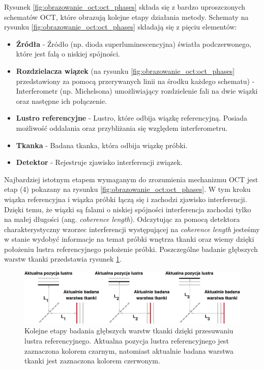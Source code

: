 Rysunek \ref{fig:obrazowanie_oct:oct_phases} składa się z bardzo uproszczonych schematów OCT, które obrazują kolejne etapy działania metody. Schematy na rysunku \ref{fig:obrazowanie_oct:oct_phases} składają się z pięciu elementów:

\begin{itemize}

\item \textbf{Źródła} - Źródło (np. dioda superluminescencyjna) światła podczerwonego, które jest falą o niskiej spójności.
\item \textbf{Rozdzielacza wiązek} (na rysunku \ref{fig:obrazowanie_oct:oct_phases} przedstawiony za pomocą przerywanych linii na środku każdego schematu) - Interferometr (np. Michelsona) umożliwiający rozdzielenie fali na dwie wiązki oraz następne ich połączenie.
\item \textbf{Lustro referencyjne} - Lustro, które odbija wiązkę referencyjną. Posiada możliwość oddalania oraz przybliżania się względem interferometru.
\item \textbf{Tkanka} - Badana tkanka, która odbija wiązkę próbki.
\item \textbf{Detektor} - Rejestruje zjawisko interferencji związek.

\end{itemize}

Najbardziej istotnym etapem wymaganym do zrozumienia mechanizmu OCT jest etap (4) pokazany na rysunku \ref{fig:obrazowanie_oct:oct_phases}. W tym kroku wiązka referencyjna i wiązka próbki łączą się i zachodzi zjawisko interferencji. Dzięki temu, że wiązki są falami o niskiej spójności interferencja zachodzi tylko na małej długości (ang. \textit{coherence length}). Odczytując za pomocą detektora charakterystyczny wzorzec interferencji występującej na \textit{coherence length} jesteśmy w stanie wydobyć informacje na temat próbki wnętrza tkanki oraz wiemy dzięki położeniu lustra referencyjnego położenie próbki. Poszczególne badanie głębszych warstw tkanki przedstawia rysunek \ref{fig:obrazowanie_oct:tissue_layers}.

\begin{figure}[htb]
	\centering
	\includegraphics[width=\textwidth]{gfx/tissue_layers}
	\caption{Kolejne etapy badania głębszych warstw tkanki dzięki przesuwaniu lustra referencyjnego. Aktualna pozycja lustra referencyjnego jest zaznaczona kolorem czarnym, natomiast aktualnie badana warstwa tkanki jest zaznaczona kolorem czerwonym.}
	\label{fig:obrazowanie_oct:tissue_layers}
\end{figure}

